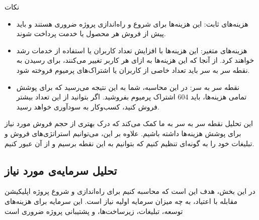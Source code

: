 \documentclass[dvipsnames, svgnames, x11names, 11pt]{article}
\begin{document}
نکات
\begin{itemize}
\item 
هزینه‌های ثابت: این هزینه‌ها برای شروع و راه‌اندازی پروژه ضروری هستند و باید پیش از فروش هر محصول یا خدمت پرداخت شوند.

\item 
هزینه‌های متغیر: این هزینه‌ها با افزایش تعداد کاربران یا استفاده از خدمات رشد خواهند کرد. از آنجا که این هزینه‌ها به ازای هر کاربر تغییر می‌کنند، برای رسیدن به نقطه سر به سر باید تعداد خاصی از کاربران یا اشتراک‌های پرمیوم فروخته شود.

\item 
نقطه سر به سر: در این محاسبه، شما به این نتیجه می‌رسید که برای پوشش تمامی هزینه‌ها، باید 604 اشتراک پرمیوم بفروشید. اگر بتوانید از این تعداد بیشتر فروش کنید، کسب‌وکار به سودآوری خواهد رسید.
\end{itemize}
این تحلیل نقطه سر به سر به ما کمک می‌کند که درک بهتری از حجم فروش مورد نیاز برای پوشش هزینه‌ها داشته باشیم. علاوه بر این، می‌توانیم استراتژی‌های فروش و تبلیغات خود را به گونه‌ای تنظیم کنیم که بتوانیم به این نقطه برسیم و از آن عبور کنیم.


\subsection{تحلیل سرمایه‌ی مورد نیاز}
در این بخش، هدف این است که محاسبه کنیم برای راه‌اندازی و شروع پروژه اپلیکیشن مقابله با اعتیاد، به چه میزان سرمایه اولیه نیاز است. این سرمایه برای هزینه‌های توسعه، تبلیغات، زیرساخت‌ها، و پشتیبانی پروژه ضروری است
\end{document}
